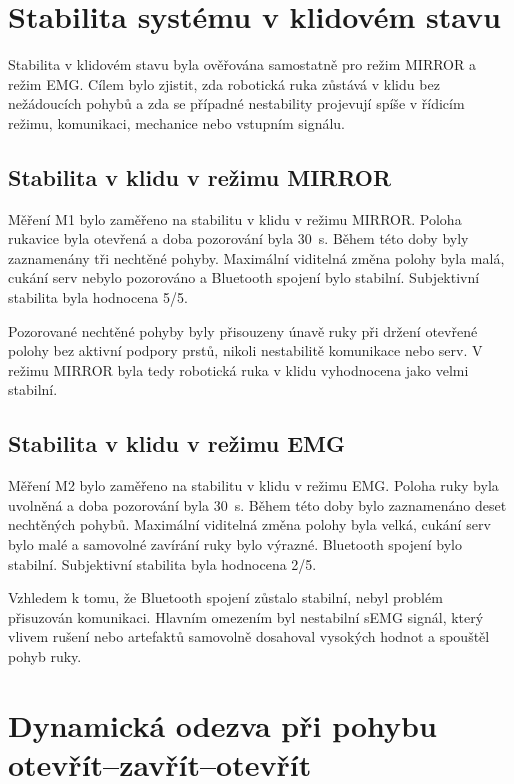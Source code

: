 \section{Stabilita systému v klidovém stavu}
\label{sec:stabilita-klid}

Stabilita v klidovém stavu byla ověřována samostatně pro režim MIRROR a režim EMG\@. Cílem bylo zjistit, zda robotická ruka zůstává v klidu bez nežádoucích pohybů a zda se případné nestability projevují spíše v řídicím režimu, komunikaci, mechanice nebo vstupním signálu.

\subsection{Stabilita v klidu v režimu MIRROR}
\label{subsec:klid-mirror}

Měření M1 bylo zaměřeno na stabilitu v klidu v režimu MIRROR\@. Poloha rukavice byla otevřená a doba pozorování byla 30~s. Během této doby byly zaznamenány tři nechtěné pohyby. Maximální viditelná změna polohy byla malá, cukání serv nebylo pozorováno a Bluetooth spojení bylo stabilní. Subjektivní stabilita byla hodnocena 5/5.

Pozorované nechtěné pohyby byly přisouzeny únavě ruky při držení otevřené polohy bez aktivní podpory prstů, nikoli nestabilitě komunikace nebo serv. V režimu MIRROR byla tedy robotická ruka v klidu vyhodnocena jako velmi stabilní.

\subsection{Stabilita v klidu v režimu EMG}
\label{subsec:klid-emg}

Měření M2 bylo zaměřeno na stabilitu v klidu v režimu EMG\@. Poloha ruky byla uvolněná a doba pozorování byla 30~s. Během této doby bylo zaznamenáno deset nechtěných pohybů. Maximální viditelná změna polohy byla velká, cukání serv bylo malé a samovolné zavírání ruky bylo výrazné. Bluetooth spojení bylo stabilní. Subjektivní stabilita byla hodnocena 2/5.

Vzhledem k tomu, že Bluetooth spojení zůstalo stabilní, nebyl problém přisuzován komunikaci. Hlavním omezením byl nestabilní sEMG signál, který vlivem rušení nebo artefaktů samovolně dosahoval vysokých hodnot a spouštěl pohyb ruky.

\section{Dynamická odezva při pohybu otevřít--zavřít--otevřít}
\label{sec:dynamicka-odezva}

